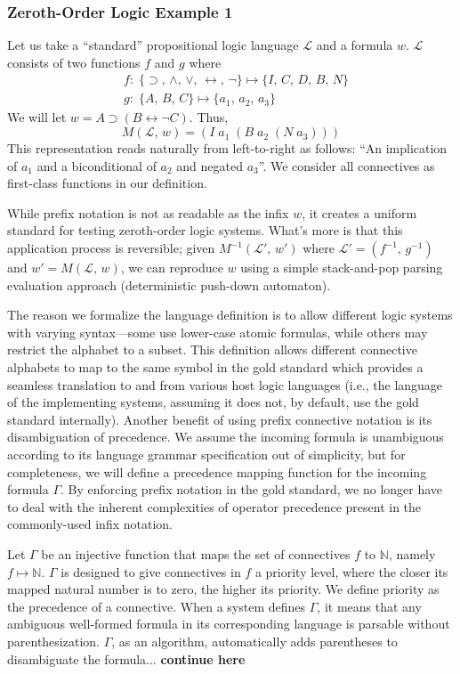 \documentclass[ms]{uncgdissertationexp2}
\theoremstyle{plain}
\theoremstyle{definition}
\theoremstyle{remark}
\begin{document}
\subsubsection{Zeroth-Order Logic Example 1} Let us take a ``standard'' propositional logic language $\mathcal{L}$ and a formula $w$. $\mathcal{L}$ consists of two functions $f$ and $g$ where
\begin{align*}
	  & f:\;\{\supset,\,\land,\,\lor,\,\leftrightarrow,\,\lnot\}\mapsto \{I,\,C,\,D,\,B,\,N\} \\
	  & g:\;\{A,\,B,\,C\} \mapsto \{a_{1},\,a_{2},\,a_{3}\}                                   
\end{align*}
We will let $w = A \supset (B \leftrightarrow \lnot C)$. Thus, 
\[
	M(\mathcal{L},\,w) = (I\;a_{1}\;(B\;a_{2}\;(N\;a_{3})))
\]
This representation reads naturally from left-to-right as follows: ``An implication of $a_1$ and a biconditional of $a_2$ and negated $a_3$''. We consider all connectives as first-class functions in our definition.

While prefix notation is not as readable as the infix $w$, it creates a uniform standard for testing zeroth-order logic systems. What's more is that this application process is reversible; given $M^{-1}(\mathcal{L}',\,w')$ where $\mathcal{L}' = (f^{-1},\,g^{-1})$ and $w' = M(\mathcal{L},\,w)$, we can reproduce $w$ using a simple stack-and-pop parsing evaluation approach (deterministic push-down automaton).
    
The reason we formalize the language definition is to allow different logic systems with varying syntax---some use lower-case atomic formulas, while others may restrict the alphabet to a subset. This definition allows different connective alphabets to map to the same symbol in the gold standard which provides a seamless translation to and from various host logic languages (i.e., the language of the implementing systems, assuming it does not, by default, use the gold standard internally). Another benefit of using prefix connective notation is its disambiguation of precedence. We assume the incoming formula is unambiguous according to its language grammar specification out of simplicity, but for completeness, we will define a precedence mapping function for the incoming formula $\Gamma$. By enforcing prefix notation in the gold standard, we no longer have to deal with the inherent complexities of operator precedence present in the commonly-used infix notation.

Let $\Gamma$ be an injective function that maps the set of connectives $f$ to $\mathbb{N}$, namely $f \mapsto \mathbb{N}$. $\Gamma$ is designed to give connectives in $f$ a priority level, where the closer its mapped natural number is to zero, the higher its priority. We define priority as the precedence of a connective. When a system defines $\Gamma$, it means that any ambiguous well-formed formula in its corresponding language is parsable without parenthesization. $\Gamma$, as an algorithm, automatically adds parentheses to disambiguate the formula... \textbf{continue here}
\end{document}
